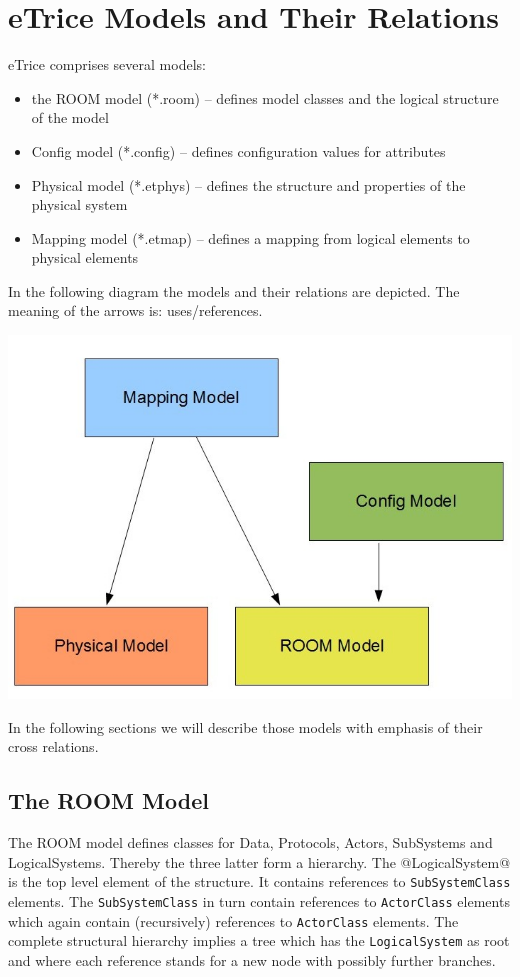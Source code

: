 \chapter{eTrice Models and Their Relations}

eTrice comprises several models:

\begin{itemize}
\item the ROOM model (*.room) -- defines model classes and the logical structure of the model
\item Config model (*.config) -- defines configuration values for attributes
\item Physical model (*.etphys) -- defines the structure and properties of the physical system
\item Mapping model (*.etmap) -- defines a mapping from logical elements to physical elements
\end{itemize}

In the following diagram the models and their relations are depicted. The meaning of the arrows is: uses/references.

\includegraphics[scale=0.4]{images/080-models.jpg}

In the following sections we will describe those models with emphasis of their cross relations.

\section{The ROOM Model}

The ROOM model defines classes for Data, Protocols, Actors, SubSystems and LogicalSystems.
Thereby the three latter form a hierarchy. The @LogicalSystem@ is the top level element of the structure. It contains references to \texttt{SubSystemClass} elements. The \texttt{SubSystemClass} in turn contain references to \texttt{ActorClass} elements which again contain (recursively) references to \texttt{ActorClass} elements. The complete structural hierarchy implies a tree which has the \texttt{LogicalSystem} as root and where each reference stands for a new node with possibly further branches.

